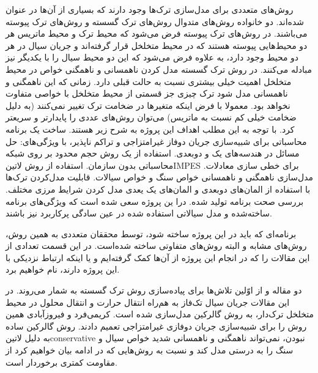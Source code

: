 روش‌های متعددی برای مدل‌سازی ترک‌ها وجود دارند که بسیاری از آن‌ها در  عنوان شده‌اند. دو خانواده روش‌های متدوال روش‌های ترک
گسسته و روش‌های ترک پیوسته می‌باشند. در روش‌های ترک پیوسته فرض می‌شود که محیط ترک و محیط ماتریس هر دو محیط‌هایی پیوسته هستند که در محیط متخلخل قرار گرفته‌اند و جریان سیال در هر دو محیط وجود دارد، به علاوه فرض می‌شود که این دو محیط سیال را با یکدیگر نیز مبادله می‌کنند. در روش ترک گسسته مدل کردن ناهمسانی و ناهمگنی خواص در محیط متخلخل اهمیت خیلی بیشتری نسبت به حالت قبلی دارد. زمانی که این ناهمگنی و ناهمسانی مدل شود ترک چیزی جز قسمتی از محیط متخلخل با خواصی متفاوت نخواهد بود. معمولا با فرض اینکه متغیر‌ها در ضخامت ترک تغییر نمی‌کنند (به دلیل ضخامت خیلی کم نسبت به ماتریس) می‌توان روش‌های عددی را پایدار‌تر و سریعتر کرد. با توجه به این مطلب اهداف این پروژه به شرح زیر هستند.
 ساخت یک برنامه محاسباتی برای شبیه‌سازی جریان دوفاز غیرامتزاجی و تراکم ناپذیر، با ویژگی‌های:
	 حل مسائل در هندسه‌های یک و دو‌بعدی.
	 استفاده از یک روش حجم محدود بر روی شبکه محاسباتی بدون سازمان.
	 استفاده از روش ‌لاتین{IMPES} برای خطی سازی معادلات.
	 مدل‌سازی ناهمگنی و ناهمسانی خواص سنگ و خواص سیالات.
	 قابلیت مدل‌کردن ترک‌ها با استفاده از المان‌های دوبعدی و المان‌های یک یعدی
	 مدل کردن شرایط مرزی مختلف.
 بررسی صحت برنامه تولید شده.
درا ین پروژه سعی شده است که ويژگی‌های برنامه ساخته‌شده و مدل سیالاتی استفاده شده در عین سادگی پرکاربرد نیز باشند.

برنامه‌ای که باید در این پروژه ساخته شود، توسط محققان متعددی به همین روش، روش‌های مشابه و البته روش‌های متفاوتی ساخته شده‌است. در این قسمت تعدادی از این مقالات را که در انجام این پروژه از آن‌ها کمک گرفته‌ایم و یا اینکه ارتباط نزدیکی با این پروژه دارند، نام خواهیم برد.

دو مقاله  و  از اوّلین تلاش‌ها برای پیاده‌سازی روش ترک گسسته به شمار می‌روند. در این مقالات جریان سیال تک‌فاز به هم‌راه انتقال حرارت و انتقال محلول در محیط متخلخل ترک‌دار، به روش گالرکین مدل‌سازی شده است. کریمی‌فرد و فیروز‌آبادی همین روش را برای شبیه‌سازی جریان دوفازی غیرامتزاجی تعمیم دادند. روش گالرکین ساده به دلیل ‌لاتین{conservative} نبودن، نمی‌تواند ناهمگنی و ناهمسانی شدید خواص سیال و سنگ را به درستی مدل کند و نسبت به روش‌هایی که در ادامه بیان خواهیم کرد از مقاومت کمتری برخوردار است.

